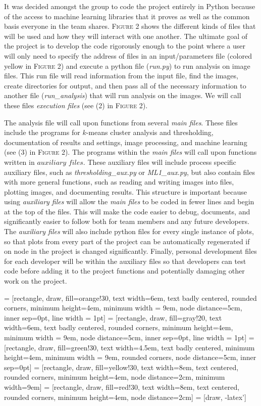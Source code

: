 \documentclass[12pt]{amsart}
\begin{document}
It was decided amongst the group to code the project entirely in Python because of the access to machine learning libraries that it proves as well as the common basis everyone in the team shares. \textsc{Figure 2} shows the different kinds of files that will be used and how they will interact with one another. The ultimate goal of the project is to develop the code rigorously enough to the point where a user will only need to specify the address of files in an input/parameters file (colored yellow in \textsc{Figure 2}) and execute a python file (\textit{run.py}) to run analysis on image files. This run file will read information from the input file, find the images, create directories for output, and then pass all of the necessary information to another file (\textit{run\_analysis}) that will run analysis on the images. We will call these files \textit{execution files} (see (2) in \textsc{Figure 2}).

The analysis file will call upon functions from several \textit{main files}. These files include the programs for $k$-means cluster analysis and thresholding, documentation of results and settings, image processing, and machine learning (see (3) in \textsc{Figure 2}). The programs within the \textit{main files} will call upon functions written in $\textit{auxiliary files}$. These auxiliary files will include process specific auxiliary files, such as \textit{thresholding\_aux.py} or \textit{ML1\_aux.py}, but also contain files with more general functions, such as reading and writing images into files, plotting images, and documenting results. This structure is important because using \textit{auxiliary files} will allow the \textit{main files} to be coded in fewer lines and begin at the top of the files. This will make the code easier to debug, documents, and significantly easier to follow both for team members and any future developers. The \textit{auxiliary files} will also include python files for every single instance of plots, so that plots from every part of the project can be automatically regenerated if on node in the project is changed significantly. Finally, personal development files for each developer will be within the auxiliary files so that developers can test code before adding it to the project functions and potentially damaging other work on the project. 


 = [rectangle, draw, fill=orange!30, 
    text width=6em, text badly centered, rounded corners, minimum height=4em, minimum width = 9em, node distance=5cm, inner sep=0pt, line width = 1pt]
     = [rectangle, draw, fill=gray!20, 
    text width=6em, text badly centered, rounded corners, minimum height=4em, minimum width = 9em, node distance=5cm, inner sep=0pt, line width = 1pt]
 = [rectangle, draw, fill=green!30,
    text width=4.5em, text badly centered,  minimum height=4em, minimum width = 9em, rounded corners, node distance=5cm, inner sep=0pt]
 = [rectangle, draw, fill=yellow!30, 
    text width=8em, text centered, rounded corners, minimum height=4em, node distance=2cm, minimum width=9em]
  = [rectangle, draw, fill=red!30, 
    text width=8em, text centered, rounded corners, minimum height=4em, node distance=2cm]
 = [draw, -latex']
\end{document}
